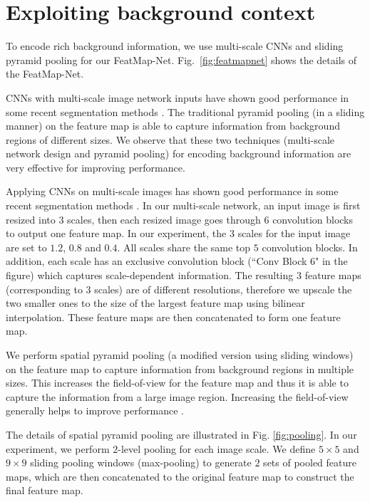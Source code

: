 \section{Exploiting background context}
\label{sec:network_details}

To encode rich background information,
we use multi-scale CNNs and  sliding pyramid pooling \cite{lazebnik2006beyond} for our FeatMap-Net.
Fig.~\ref{fig:featmapnet} shows the details of the FeatMap-Net.


CNNs with multi-scale image network inputs have shown good performance in some recent segmentation methods \cite{farabet2013learning,MostajabiYS14}.
The traditional pyramid pooling (in a sliding manner) on the feature map is able to capture information from background regions of different sizes.
%
We observe that these two techniques (multi-scale network design and pyramid pooling) 
for encoding background information are very effective for improving performance.



Applying CNNs on multi-scale images has shown good performance in some recent segmentation methods \cite{farabet2013learning,MostajabiYS14}.
In our multi-scale network, an input image is first resized into $3$ scales,
then each resized image goes through 6 convolution blocks to output one feature map.
In our experiment, the $3$ scales for the input image are set to $1.2$, $0.8$ and $0.4$.
All scales share the same top $5$ convolution blocks.
In addition, each scale has an exclusive convolution block (``Conv Block 6" in the figure) 
which captures scale-dependent information.
The resulting $3$ feature maps (corresponding to $3$ scales) are of different resolutions, therefore we  upscale the two smaller ones to the size of the largest feature map using bilinear interpolation. These feature maps are then concatenated to form one feature map.


We perform spatial pyramid pooling \cite{lazebnik2006beyond} (a modified version using sliding windows) 
on the feature map to capture information from background regions in multiple sizes.
This increases the field-of-view for the feature map and thus it is able to capture the information from a large image region.
Increasing the field-of-view generally helps to improve performance \cite{ChenPKMY14}.


The details of spatial pyramid pooling are illustrated in Fig. \ref{fig:pooling}.
In our experiment, we perform $2$-level pooling for each image scale.
We define $5 \times 5$ and $9 \times 9$ sliding pooling windows (max-pooling) to generate $2$ sets of pooled feature maps,
which are then concatenated to the original feature map to construct the final feature map.


